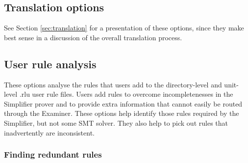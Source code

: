 \documentclass[12pt,fleqn]{article}
\begin{document}
\subsection{Translation options}

See Section \ref{sec:translation} for a presentation of these options,
since they make best sense in a discussion of the overall translation
process.

\subsection{User rule analysis}
\label{sec:user-rule-analysis}

These options analyse the rules that users add to the directory-level
and unit-level .rlu user rule files.  Users add rules to overcome
incompletenesses in the Simplifier prover and to provide extra
information that cannot easily be routed through the Examiner.  These
options help identify those rules required by the Simplifier, but not
some SMT solver.  They also help to pick out rules that inadvertently
are inconsistent.


\subsubsection{Finding redundant rules}
\end{document}
